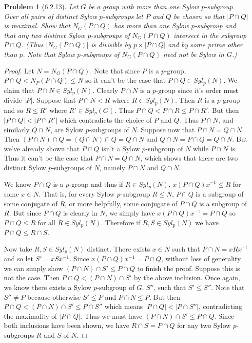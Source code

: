 \documentclass{article}
\newtheorem{problem}{Problem}
\begin{document}
\begin{problem}[6.2.13]
Let $G$ be a group with more than one Sylow $p$-subgroup. Over all pairs of distinct Sylow $p$-subgroups let $P$ and $Q$ be chosen so that $|P \cap Q|$ is maximal. Show that $N_G(P \cap Q)$ has more than one Sylow $p$-subgroup and that any two distinct Sylow $p$-subgroups of $N_G(P \cap Q)$ intersect in the subgroup $P \cap Q$. (Thus $|N_G(P \cap Q)|$ is divisible by $p \times |P \cap Q|$ and by some prime other than $p$. Note that Sylow $p$-subgroups of $N_G(P \cap Q)$ need not be Sylow in $G$.)
\end{problem}
\begin{proof}
Let $N = N_G(P \cap Q)$. Note that since $P$ is a $p$-group, $P \cap Q < N_P(P \cap Q) \leq N$ so it can't be the case that $P \cap Q \in Syl_p(N)$.  We claim that $P \cap N \in Syl_p(N)$. Clearly $P \cap N$ is a $p$-group since it's order must divide $|P|$. Suppose that $P \cap N < R$ where $R \in Syl_p(N)$. Then $R$ is a $p$-group and so $R \leq R'$ where $R' \in Syl_p(G)$. Thus $P \cap Q < P \cap R \leq P \cap R'$. But then $|P \cap Q| < |P \cap R'|$ which contradicts the choice of $P$ and $Q$. Thus $P \cap N$, and similarly $Q \cap N$, are Sylow $p$-subgroups of $N$. Suppose now that $P \cap N = Q \cap N$. Then $(P \cap N) \cap Q = (Q \cap N) \cap Q = Q \cap N$ and $Q \cap N = P \cap Q = Q \cap N$. But we've already shown that $P \cap Q$ isn't a Sylow $p$-subgroup of $N$ while $P \cap N$ is. Thus it can't be the case that $P \cap N = Q \cap N$, which shows that there are two distinct Sylow $p$-subgroups of $N$, namely $P \cap N$ and $Q \cap N$.

We know $P \cap Q$ is a $p$-group and thus if $R \in Syl_p(N)$, $x(P \cap Q)x^{-1} \leq R$ for some $x \in N$. That is, for every Sylow $p$-subgroup $R \leq N$, $P \cap Q$ is a subgroup of some conjugate of $R$, or more helpfully, some conjugate of $P \cap Q$ is a subgroup of $R$. But since $P \cap Q$ is clearly in $N$, we simply have $x(P \cap Q)x^{-1} = P \cap Q$ so $P \cap Q \leq R$ for all $R \in Syl_p(N)$. Therefore if $R, S \in Syl_p(N)$ we have $P \cap Q \leq R \cap S$.

Now take $R, S \in Syl_p(N)$ distinct. There exists $x \in N$ such that $P \cap N = xRx^{-1}$ and so let $S' = xSx^{-1}$. Since $x(P \cap Q)x^{-1} = P \cap Q$, without loss of generality we can simply show $(P \cap N) \cap S' \leq P \cap Q$ to finish the proof. Suppose this is not the case. Then $P \cap Q < (P \cap N) \cap S'$ by the above inclusion. Once again, we know there exists a Sylow $p$-subgroup of $G$, $S''$, such that $S' \leq S''$. Note that $S'' \neq P$ because otherwise $S' \leq P$ and $P \cap N \leq P$. But then $P \cap Q < (P \cap N) \cap S' \leq P \cap S''$ which means $|P \cap Q| < |P \cap S''|$, contradicting the maximality of $|P \cap Q|$. Thus we must have $(P \cap N) \cap S' \leq P \cap Q$. Since both inclusions have been shown, we have $R \cap S = P \cap Q$ for any two Sylow $p$-subgroups $R$ and $S$ of $N$.
\end{proof}
\end{document}
